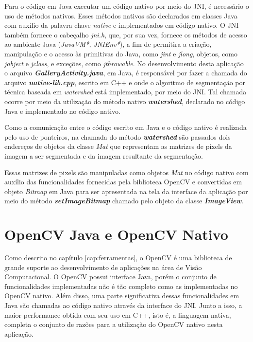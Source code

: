 Para o código em Java executar um código nativo por meio do JNI, é necessário o uso de métodos nativos. Esses métodos nativos são declarados em classes Java com auxílio da palavra chave \textit{native} e implementados em código nativo. 
O JNI também fornece o cabeçalho \textit{jni.h}, que, por sua vez, fornece os métodos de acesso ao ambiente Java (\textit{JavaVM*, JNIEnv*}), a fim de permitira a criação, manipulação e o acesso às primitivas do Java, como \textit{jint} e \textit{jlong}, objetos, como \textit{jobject} e \textit{jclass}, e exceções, como \textit{jthrowable}.
No desenvolvimento desta aplicação o arquivo \textbf{\textit{GalleryActivity.java}}, em Java, é responsável por fazer a chamada do arquivo \textbf{\textit{native-lib.cpp}}, escrito em C++ e onde o algoritmo de segmentação por técnica baseada em \textit{watershed} está implementado, por meio do JNI. Tal chamada ocorre por meio da utilização do método nativo \textbf{\textit{watershed}}, declarado no código Java e implementado no código nativo. 

Como a comunicação entre o código escrito em Java e o código nativo é realizada pelo uso de ponteiros, na chamada do método \textbf{\textit{watershed}} são passados dois endereços de objetos da classe \textit{Mat} que representam as matrizes de pixels da imagem a ser segmentada e da imagem resultante da segmentação.

Essas matrizes de pixels são manipuladas como objetos \textit{Mat} no código nativo com auxílio das funcionalidades fornecidas pela biblioteca OpenCV e convertidas em objeto \textit{Bitmap} em Java para ser apresentada na tela da interface da aplicação por meio do método \textbf{\textit{setImageBitmap}} chamado pelo objeto da classe \textbf{\textit{ImageView}}.

\section{OpenCV Java e OpenCV Nativo}\label{sec:opencv_java_nativo}
Como descrito no capítulo \ref{cap:ferramentas}, o OpenCV é uma biblioteca de grande suporte ao desenvolvimento de aplicações na área de Visão Computacional. O OpenCV possui interface Java, porém o conjunto de funcionalidades implementadas não é tão completo como as implementadas no OpenCV nativo. Além disso, uma parte significativa dessas funcionalidades em Java são chamadas ao código nativo através da interface do JNI. Junto a isso, a maior performance obtida com seu uso em C++, isto é, a linguagem nativa, completa o conjunto de razões para a utilização do OpenCV nativo nesta aplicação.

